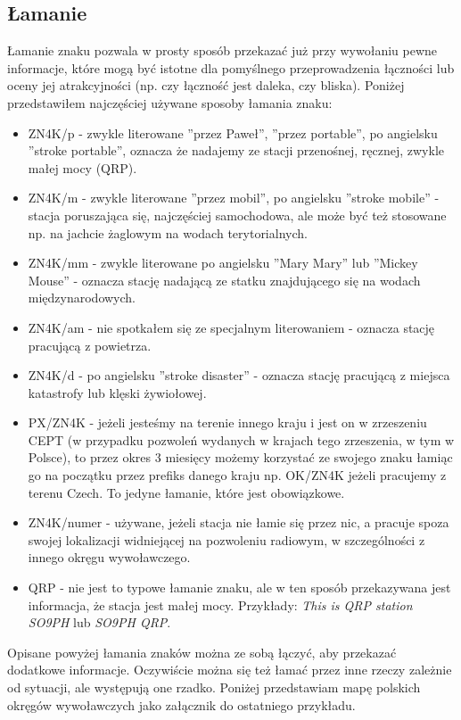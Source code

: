 \documentclass[a4paper,11pt]{article}
\begin{document}
\subsection{Łamanie}
Łamanie znaku pozwala w prosty sposób przekazać już przy wywołaniu pewne informacje, które mogą być istotne dla pomyślnego przeprowadzenia łączności lub oceny jej atrakcyjności (np. czy łączność jest daleka, czy bliska). Poniżej przedstawiłem najczęściej używane sposoby łamania znaku:
\begin{itemize}
\item ZN4K/p - zwykle literowane ''przez Paweł'', ''przez portable'', po angielsku ''stroke portable'', oznacza że nadajemy ze stacji przenośnej, ręcznej, zwykle małej mocy (QRP).
\item ZN4K/m - zwykle literowane ''przez mobil'', po angielsku ''stroke mobile'' - stacja poruszająca się, najczęściej samochodowa, ale może być też stosowane np. na jachcie żaglowym na wodach terytorialnych.
\item ZN4K/mm - zwykle literowane po angielsku ''Mary Mary'' lub ''Mickey Mouse'' - oznacza stację nadającą ze statku znajdującego się na wodach międzynarodowych.
\item ZN4K/am - nie spotkałem się ze specjalnym literowaniem - oznacza stację pracującą z powietrza.
\item ZN4K/d - po angielsku ''stroke disaster'' - oznacza stację pracującą z miejsca katastrofy lub klęski żywiołowej.
\item PX/ZN4K - jeżeli jesteśmy na terenie innego kraju i jest on w zrzeszeniu CEPT (w przypadku pozwoleń wydanych w krajach tego zrzeszenia, w tym w Polsce), to przez okres 3 miesięcy możemy korzystać ze swojego znaku łamiąc go na początku przez prefiks danego kraju np. OK/ZN4K jeżeli pracujemy z terenu Czech. To jedyne łamanie, które jest obowiązkowe.
\item ZN4K/numer - używane, jeżeli stacja nie łamie się przez nic, a pracuje spoza swojej lokalizacji widniejącej na pozwoleniu radiowym, w szczególności z innego okręgu wywoławczego.
\item QRP - nie jest to typowe łamanie znaku, ale w ten sposób przekazywana jest informacja, że stacja jest małej mocy. Przykłady: \textit{This is QRP station SO9PH} lub \textit{SO9PH QRP}.
\end{itemize}
Opisane powyżej łamania znaków można ze sobą łączyć, aby przekazać dodatkowe informacje. Oczywiście można się też łamać przez inne rzeczy zależnie od sytuacji, ale występują one rzadko. Poniżej przedstawiam mapę polskich okręgów wywoławczych jako załącznik do ostatniego przykładu.
\end{document}
